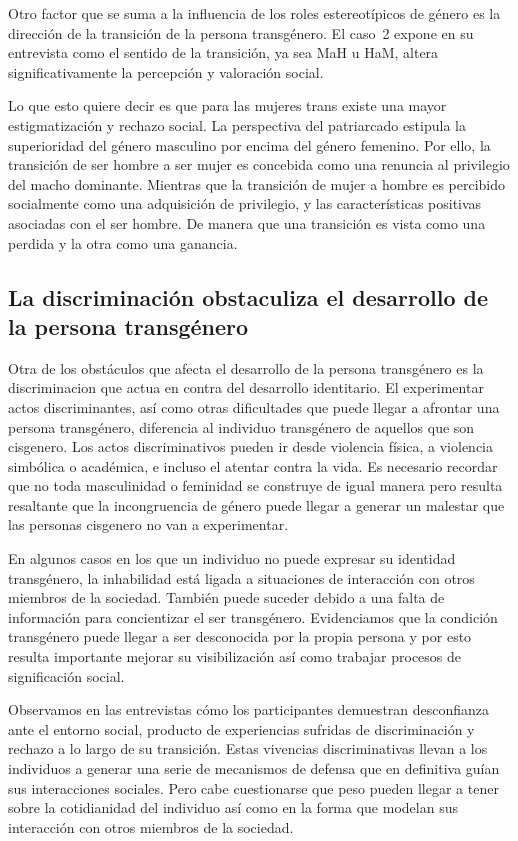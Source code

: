 Otro factor que se suma a la influencia de los roles estereotípicos de género es
la dirección de la transición de la persona transgénero. El caso~2 expone en su
entrevista como el sentido de la transición, ya sea MaH u HaM, altera
significativamente la percepción y valoración social.

Lo que esto quiere decir es que para las mujeres trans existe una mayor
estigmatización y rechazo social. La perspectiva del patriarcado estipula la
superioridad del género masculino por encima del género femenino. Por ello, la
transición de ser hombre a ser mujer es concebida como una renuncia al
privilegio del macho dominante. Mientras que la transición de mujer a hombre es
percibido socialmente como una adquisición de privilegio, y las características
positivas asociadas con el ser hombre. De manera que una transición es vista
como una perdida y la otra como una ganancia.

\subsection{La discriminación obstaculiza el desarrollo de la persona transgénero}

Otra de los obstáculos que afecta el desarrollo de la persona transgénero es la
discriminacion que actua en contra del desarrollo identitario. El experimentar
actos discriminantes, así como otras dificultades que puede llegar a afrontar
una persona transgénero, diferencia al individuo transgénero de aquellos que son
cisgenero. Los actos discriminativos pueden ir desde violencia física, a
violencia simbólica o académica, e incluso el atentar contra la vida. Es
necesario recordar que no toda masculinidad o feminidad se construye de igual
manera pero resulta resaltante que la incongruencia de género puede llegar a
generar un malestar que las personas cisgenero no van a experimentar.

En algunos casos en los que un individuo no puede expresar su identidad
transgénero, la inhabilidad está ligada a situaciones de interacción con otros
miembros de la sociedad. También puede suceder debido a una falta de información
para concientizar el ser transgénero. Evidenciamos que la condición transgénero
puede llegar a ser desconocida por la propia persona y por esto resulta
importante mejorar su visibilización así como trabajar procesos de significación
social.

Observamos en las entrevistas cómo los participantes demuestran desconfianza
ante el entorno social, producto de experiencias sufridas de discriminación y
rechazo a lo largo de su transición. Estas vivencias discriminativas llevan a
los individuos a generar una serie de mecanismos de defensa que en definitiva
guían sus interacciones sociales. Pero cabe cuestionarse que peso pueden
llegar a tener sobre la cotidianidad del individuo así como en la forma que
modelan sus interacción con otros miembros de la sociedad.

